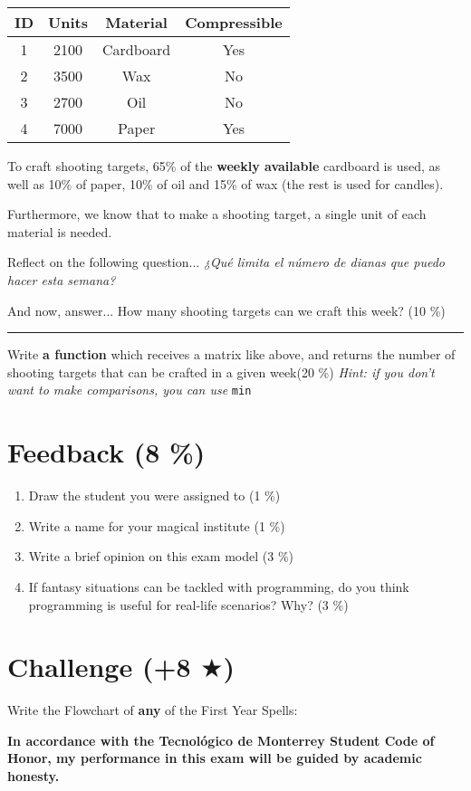 \documentclass[11pt, onside]{article}
\newcommand{\matlab}[1]{\lstinline[style=Matlab-editor]!#1!}
\newcommand{\shortresponserule}{{\large\rule{5 cm}{0.3mm}}}
\begin{document}
\begin{table}[htbp]
    \centering
    \begin{tabular}{@{}cccc@{}}
    \toprule
    \textbf{ID} & \textbf{Units} & \textbf{Material} & \textbf{Compressible} \\ \midrule
    1 & 2100 & Cardboard & Yes \\
    2 & 3500 & Wax & No \\
    3 & 2700 & Oil & No \\
    4 & 7000 & Paper & Yes \\ \bottomrule
    \end{tabular}
\end{table}

To craft shooting targets, 65\% of the \textbf{weekly available} cardboard is used, as well as 10\% of paper, 10\% of oil and 15\% of wax (the rest is used for candles).

Furthermore, we know that to make a shooting target, a single unit of each material is needed.

Reflect on the following question...
\textit{¿Qué limita el número de dianas que puedo hacer esta semana?}

And now, answer...
How many shooting targets can we craft this week? (10 \%) \shortresponserule

\bigskip

Write \textbf{a function} which receives a matrix like above, and returns the number of shooting targets that can be crafted in a given week(20 \%)
\textit{Hint: if you don't want to make comparisons, you can use} \matlab{min}

\section{Feedback (8 \%)}

\begin{enumerate}[label=\alph*)]
    \item Draw the student you were assigned to (1 \%)
    \item Write a name for your magical institute (1 \%)
    \item Write a brief opinion on this exam model (3 \%)
    \item If fantasy situations can be tackled with programming, do you think programming is useful for real-life scenarios? Why? (3 \%)
\end{enumerate}

\section{Challenge (+8 $\bigstar$)}

Write the Flowchart of \textbf{any} of the First Year Spells:

\vfill

\textbf{In accordance with the Tecnológico de Monterrey Student Code of Honor, my performance in this exam will be guided by academic honesty.}
\end{document}
